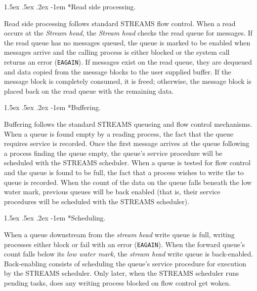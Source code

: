 \documentclass[letterpaper,final,notitlepage,twocolumn,10pt,twoside]{article}
\makeatletter
\let\normalsize = \small
\let\small = \footnotesize
\let\footnotesize = \scriptsize
\let\scriptsize = \tiny
\renewcommand\paragraph{\@startsection{paragraph}{4}{\z@}%
                                    {1.5ex \@plus .5ex \@minus .2ex}%
                                    {-1em}%
                                    {\normalfont\normalsize\bfseries\slshape}}
\makeatother
\begin{document}
\paragraph*{Read side processing.}

Read side processing follows standard STREAMS flow control.  When a read occurs at the
\textit{Stream head}, the \textit{Stream head} checks the read queue for messages.  If the read
queue has no messages queued, the queue is marked to be enabled when messages arrive and the calling
process is either blocked or the system call returns an error (\texttt{EAGAIN}).  If messages exist
on the read queue, they are dequeued and data copied from the message blocks to the user supplied
buffer.  If the message block is completely consumed, it is freed; otherwise, the message block is
placed back on the read queue with the remaining data.

\paragraph*{Buffering.}

Buffering follows the standard STREAMS queueing and flow control mechanisms.  When a queue is found
empty by a reading process, the fact that the queue requires service is recorded.  Once the first
message arrives at the queue following a process finding the queue empty, the queue's service
procedure will be scheduled with the STREAMS scheduler.  When a queue is tested for flow control and
the queue is found to be full, the fact that a process wishes to write the to queue is recorded.
When the count of the data on the queue falls beneath the low water mark, previous queues will be
back enabled (that is, their service procedures will be scheduled with the STREAMS scheduler).

\paragraph*{Scheduling.}

When a queue downstream from the \textit{stream head} write queue is full, writing processes either
block or fail with an error (\texttt{EAGAIN}).  When the forward queue's count falls below its
\textit{low water mark}, the \textit{stream head} write queue is back-enabled.  Back-enabling
consists of scheduling the queue's service procedure for execution by the STREAMS scheduler.  Only
later, when the STREAMS scheduler runs pending tasks, does any writing process blocked on flow
control get woken.
\end{document}
